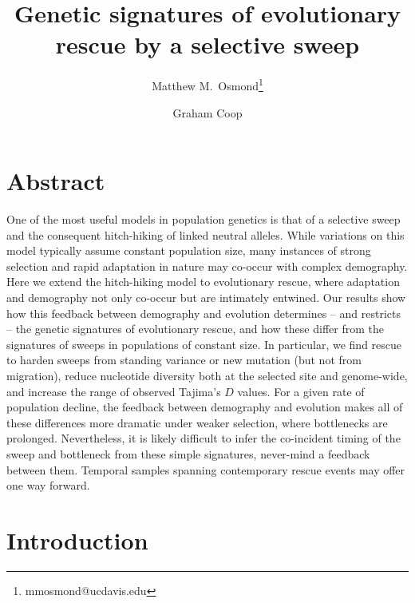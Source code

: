\documentclass[]{article}
\title{Genetic signatures of evolutionary rescue by a selective sweep}
\author[*]{Matthew M.\ Osmond\thanks{mmosmond@ucdavis.edu}}
\author[*]{Graham Coop}
\affil[*]{Center for Population Biology and Department of Evolution and Ecology, University of California, Davis, California 95616}
\date{}
\begin{document}

\maketitle

\section*{Abstract}
\label{sec:abstract}

One of the most useful models in population genetics is that of a selective sweep and the consequent hitch-hiking of linked neutral alleles.
While variations on this model typically assume constant population size, many instances of strong selection and rapid adaptation in nature may co-occur with complex demography.
Here we extend the hitch-hiking model to evolutionary rescue, where adaptation and demography not only co-occur but are intimately entwined. 
Our results show how this feedback between demography and evolution determines -- and restricts -- the genetic signatures of evolutionary rescue, and how these differ from the signatures of sweeps in populations of constant size.
In particular, we find rescue to harden sweeps from standing variance or new mutation (but not from migration), reduce nucleotide diversity both at the selected site and genome-wide, and increase the range of observed Tajima's $D$ values.
For a given rate of population decline, the feedback between demography and evolution makes all of these differences more dramatic under weaker selection, where bottlenecks are prolonged. 
Nevertheless, it is likely difficult to infer the co-incident timing of the sweep and bottleneck from these simple signatures, never-mind a feedback between them. 
Temporal samples spanning contemporary rescue events may offer one way forward.

\section*{Introduction}
\label{sec:intro}
\end{document}

